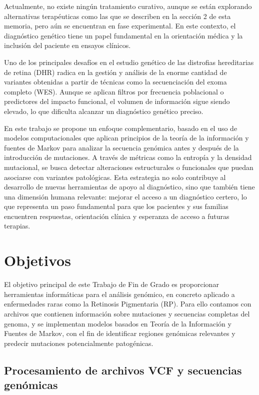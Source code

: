 \documentclass[11pt,spanish,listoffigures,listoftables]{tfgetsinf}
\begin{document}
Actualmente, no existe ningún tratamiento curativo, aunque se están explorando alternativas terapéuticas como las que se describen en la sección 2 de esta memoria, pero aún se encuentran en fase experimental. En este contexto, el diagnóstico genético tiene un papel fundamental en la orientación médica y la inclusión del paciente en ensayos clínicos\cite{HAN}.

Uno de los principales desafíos en el estudio genético de las distrofias hereditarias de retina (DHR) radica en la gestión y análisis de la enorme cantidad de variantes obtenidas a partir de técnicas como la secuenciación del exoma completo (WES). Aunque se aplican filtros por frecuencia poblacional o predictores del impacto funcional, el volumen de información sigue siendo elevado, lo que dificulta alcanzar un diagnóstico genético preciso\cite{DEC}.

En este trabajo se propone un enfoque complementario, basado en el uso de modelos computacionales que aplican principios de la teoría de la información y fuentes de Markov para analizar la secuencia genómica antes y después de la introducción de mutaciones. A través de métricas como la entropía y la densidad mutacional, se busca detectar alteraciones estructurales o funcionales que puedan asociarse con variantes patológicas. Esta estrategia no solo contribuye al desarrollo de nuevas herramientas de apoyo al diagnóstico, sino que también tiene una dimensión humana relevante: mejorar el acceso a un diagnóstico certero, lo que representa un paso fundamental para que los pacientes y sus familias encuentren respuestas, orientación clínica y esperanza de acceso a futuras terapias. 

\section{Objetivos}

El objetivo principal de este Trabajo de Fin de Grado es proporcionar herramientas informáticas para el análisis genómico, en concreto aplicado a enfermedades raras como la Retinosis Pigmentaria (RP). Para ello contamos con archivos que contienen información sobre mutaciones y secuencias completas del genoma, y se implementan modelos basados en Teoría de la Información y Fuentes de Markov, con el fin de identificar regiones genómicas relevantes y predecir mutaciones potencialmente patogénicas.

\subsection{Procesamiento de archivos VCF y secuencias genómicas}
\end{document}
